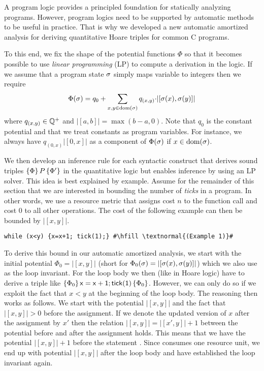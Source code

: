 \documentclass[nocopyrightspace,preprint]{sigplanconf}
\begin{document}
A program logic provides a principled foundation for statically
analyzing programs.  However, program logics need to be supported by
automatic methods to be useful in practice.  That is why we developed a
new automatic amortized analysis for deriving quantitative Hoare
triples for common C programs.

To this end, we fix the shape of the potential functions $\Phi$ so
that it becomes possible to use \emph{linear programming} (LP) to
compute a derivation in the logic.  If we assume that a program state
$\sigma$ simply maps variable to integers then we require
$$
\Phi(\sigma) = q_0 + \sum_{x,y \in  \text{dom}(\sigma)} q_{(x,y)} {\cdot} |[\sigma(x),\sigma(y)]|
$$
where $q_{(x,y)} \in \mathbb{Q^+}$ and $|[a,b]| = \max(b-a,0)$.  Note that
$q_0$ is the constant potential and that we treat constants as program
variables.  For instance, we always have $q_{(0,x)}|[0,x]|$ as a
component of $\Phi(\sigma)$ if $x \in  \text{dom}(\sigma)$.

We then develop an inference rule for each syntactic construct that
derives sound triples $\{\Phi\}\, P\, \{\Phi'\}$ in the quantitative
logic but enables inference by using an LP solver.  This idea is best
explained by example.  Assume for the remainder of this section that
we are interested in bounding the number of \emph{ticks} in a program.
In other words, we use a resource metric that assigns cost $n$ to the
function call  and cost $0$ to all other operations.
The cost of the following example can then be bounded by $|[x,y]|$.
\begin{lstlisting}
while (x<y) {x=x+1; tick(1);} #\hfill \textnormal{(Example 1)}#
\end{lstlisting}
To derive this bound in our automatic amortized analysis, we start
with the initial potential $\Phi_0 = |[x,y]|$ (short for
$\Phi_0(\sigma) = |[\sigma(x),\sigma(y)]|$) which we also use as the
loop invariant.  For the loop body we then (like in Hoare logic) have
to derive a triple like
$\{\Phi_0\}\, \mathsf{x=x+1;tick(1)}\, \{\Phi_0\}$.  However, we can
only do so if we exploit the fact that $x<y$ at the beginning of the
loop body.  The reasoning then works as follows.  We start with the
potential $|[x,y]|$ and the fact that $|[x,y]| > 0$ before the
assignment.  If we denote the updated version of $x$ after the
assignment by $x'$ then the relation $|[x,y]| = |[x',y]| + 1$ between
the potential before and after the assignment  holds.
This means that we have the potential $|[x,y]| + 1$ before the
statement .  Since  consumes one resource unit,
we end up with potential $|[x,y]|$ after the loop body and have
established the loop invariant again.
\end{document}
